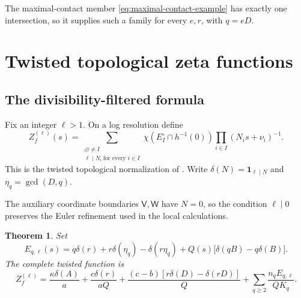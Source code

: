 \documentclass[11pt]{article}
\numberwithin{equation}{section}
\newtheorem{theorem}{Theorem}[section]
\theoremstyle{definition}
\theoremstyle{remark}
\newcommand{\one}{\mathbf 1}
\begin{document}
The maximal-contact member \eqref{eq:maximal-contact-example}
has exactly one intersection, so it supplies such a family
for every $e,r$, with $q=eD$.

\section{Twisted topological zeta functions}\label{sec:twisted}

\subsection{The divisibility-filtered formula}

Fix an integer $\ell>1$. On a log resolution define
\begin{equation}\label{eq:twisted-definition}
 Z_f^{(\ell)}(s)=
   \sum_{\substack{\varnothing\ne I\\
                  \ell\mid N_i\ \text{for every }i\in I}}
       \chi(E_I^\circ\cap h^{-1}(0))
            \prod_{i\in I}(N_i s+\nu_i)^{-1}.
\end{equation}
This is the twisted topological normalization of
\cite[Section~1.3, equation~(1.6)]{AGGL26}.
Write $\delta(N)=\one_{\ell\mid N}$ and $\eta_q=\gcd(D,q)$.

The auxiliary coordinate boundaries $\mathsf V,\mathsf W$
have $N=0$, so the condition $\ell\mid0$ preserves the Euler
refinement used in the local calculations.

\begin{theorem}\label{thm:twisted-formula}
Set
\begin{equation}\label{eq:twisted-e}
 E_{q,\ell}(s)=q\delta(r)+r\delta(\eta_q)
       -\delta(r\eta_q)
       +Q(s)\bigl[\delta(qB)-q\delta(B)\bigr].
\end{equation}
The complete twisted function is
\begin{equation}\label{eq:global-twisted}
 Z_f^{(\ell)}
 =\frac{\kappa\delta(A)}a+\frac{c\delta(r)}{aQ}
   +\frac{(c-b)[r\delta(D)-\delta(rD)]}{Q}
   +\sum_{q\ge2}\frac{n_q E_{q,\ell}}{QK_q}.
\end{equation}
\end{theorem}
\end{document}
